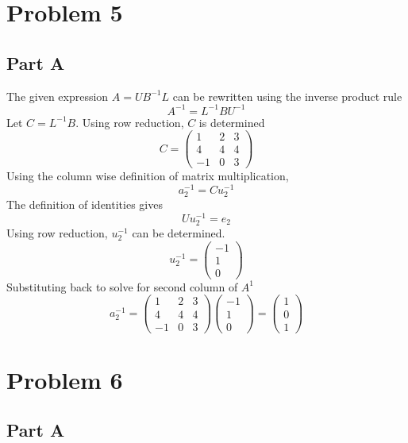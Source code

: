 \documentclass{article}
\begin{document}
\section*{Problem 5}

\subsection*{Part A}

The given expression $ A = U B^{-1} L $ can be rewritten using the inverse
product rule
$$ A^{-1} = L^{-1} B U^{-1} $$
Let $ C = L^{-1} B $. Using row reduction, $ C $ is determined
\[
    C = \begin{pmatrix}
        1 & 2 & 3 \\
        4 & 4 & 4 \\
        -1 & 0 & 3
    \end{pmatrix}
\]
Using the column wise definition of matrix multiplication,
$$ a_2^{-1} = C u_2^{-1} $$
The definition of identities gives
$$ U u_2^{-1} = e_2 $$
Using row reduction, $ u_2^{-1} $ can be determined.
\[
    u_2^{-1} = \begin{pmatrix}
        -1 \\
        1 \\
        0
    \end{pmatrix}
\]
Substituting back to solve for second column of $ A^{1} $
\[
    a_2^{-1} = \begin{pmatrix}
        1 & 2 & 3 \\
        4 & 4 & 4 \\
        -1 & 0 & 3
    \end{pmatrix}
    \begin{pmatrix}
        -1 \\
        1 \\
        0
    \end{pmatrix}
    = \begin{pmatrix}
        1 \\
        0 \\
        1
    \end{pmatrix}
\]

\section*{Problem 6}

\subsection*{Part A}
\end{document}
